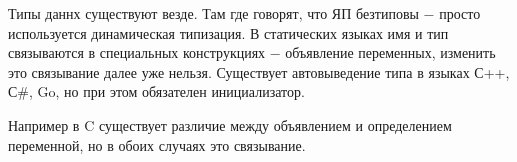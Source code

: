 \documentclass[a4paper, 12pt, titlepage, finall]{extreport}
\begin{document}
            Типы даннх существуют везде. Там где говорят, что ЯП безтиповы $-$ просто используется динамическая типизация.
            В статических языках имя и тип связываются в специальных конструкциях $-$ объявление переменных, изменить это связывание далее уже нельзя.
            Существует автовыведение типа в языках С++, С\#, Go, но при этом обязателен инициализатор.

            Например в C существует различие между объявлением и определением переменной, но в обоих случаях это связывание.
\end{document}
